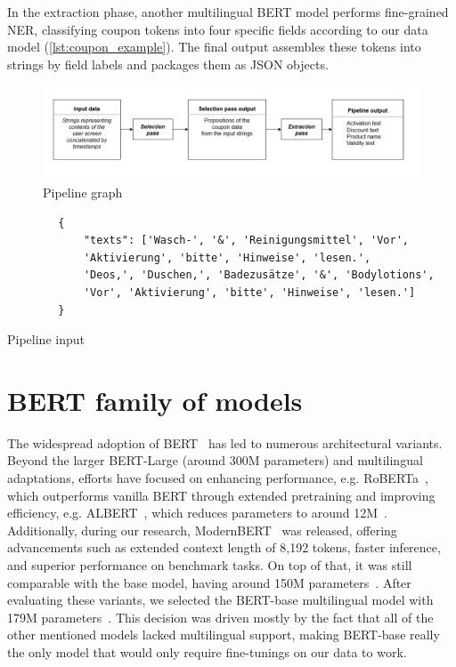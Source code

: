 \documentclass[licencjacka,en]{pracamgr}
\begin{document}
In the extraction phase, another multilingual BERT model performs fine-grained NER, classifying coupon tokens into four specific fields according to our data model (\ref{lst:coupon_example}). The final output assembles these tokens into strings by field labels and packages them as JSON objects.

\begin{figure}
    \centering
    \includegraphics[width=1.0\linewidth]{bachelor_images/zpp.png}
    \caption{Pipeline graph}
    \label{fig:zpp}
\end{figure}

\begin{center}
   \begin{listing}
        \begin{verbatim}
        {     
            "texts": ['Wasch-', '&', 'Reinigungsmittel', 'Vor',
            'Aktivierung', 'bitte', 'Hinweise', 'lesen.',
            'Deos,', 'Duschen,', 'Badezusätze', '&', 'Bodylotions',
            'Vor', 'Aktivierung', 'bitte', 'Hinweise', 'lesen.']
        }
        \end{verbatim}
        \caption{Pipeline input} 
        \label{list:sel-input}
    \end{listing}
\end{center}

\section{BERT family of models}
The widespread adoption of BERT~\cite{BERT_hf} has led to numerous architectural variants. Beyond the larger BERT-Large (around 300M parameters) and multilingual adaptations, efforts have focused on enhancing performance, e.g. RoBERTa~\cite{RoBERTa}, which outperforms vanilla BERT through extended pretraining and improving efficiency, e.g. ALBERT~\cite{ALBERT}, which reduces parameters to  around 12M~\cite{ALBERT_hf}.
Additionally, during our research, ModernBERT~\cite{ModernBERTPaper} was released, offering advancements such as extended context length of 8,192 tokens, faster inference, and superior performance on benchmark tasks. On top of that, it was still comparable with the base model, having around 150M parameters~\cite{ModernBERThf}.
After evaluating these variants, we selected the BERT-base multilingual model with 179M parameters~\cite{BERT_multiling}. This decision was driven mostly by the fact that all of the other mentioned models lacked multilingual support, making BERT-base really the only model that would only require fine-tunings on our data to work.
\end{document}

